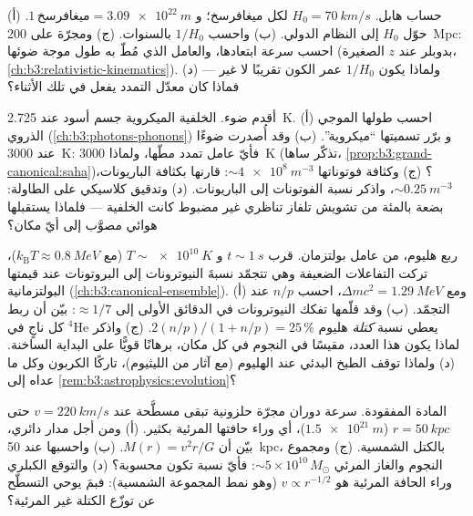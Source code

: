 \begin{exercise}[$\star\star\star$]\label{exo:b3:astrophysics:9}
حساب هابل. $H_0 = \qty{70}{km/s}$ لكل ميغافرسخ؛ و $1\,
\text{ميغافرسخ} = \qty{3.09e22}{m}$. (أ) حوّل $H_0$ إلى النظام الدولي. (ب)
واحسب $1/H_0$ بالسنوات. (ج) ومجرّة على \qty{200}{Mpc}: احسب
سرعة ابتعادها، والعامل الذي مُطّ به طول موجة ضوئها
(بدوبلر عند $z$ الصغيرة،
\cref{ch:b3:relativistic-kinematics}). (د) ولماذا يكون $1/H_0$
عمر الكون تقريبًا لا غير --- فماذا كان معدّل التمدد
يفعل في تلك الأثناء؟
\end{exercise}

\begin{exercise}[$\star\star\star$]\label{exo:b3:astrophysics:10}
أقدم ضوء. الخلفية الميكروية جسم أسود عند \qty{2.725}{K}. (أ)
احسب طولها الموجي الذروي (\cref{ch:b3:photons-phonons}) و
برّر تسميتها ``ميكروية''. (ب) وقد أُصدرت ضوءًا عند
\qty{3000}{K}: فأيّ عامل تمدد مطّها،
ولماذا \qty{3000}{K} (تذكّر ساها،
\cref{prop:b3:grand-canonical:saha})؟ (ج) وكثافة فوتوناتها
$\sim\qty{4e8}{m^{-3}}$: قارنها بكثافة الباريونات،
$\sim\qty{0.25}{m^{-3}}$، واذكر نسبة الفوتونات إلى الباريونات.
(د) وتدقيق كلاسيكي على الطاولة: بضعة بالمئة من تشويش تلفاز
تناظري غير مضبوط كانت الخلفية --- فلماذا يستقبلها هوائي
مصوَّب إلى أيّ مكان؟
\end{exercise}

\begin{exercise}[$\star\star\star$]\label{exo:b3:astrophysics:11}
ربع هليوم، من عامل بولتزمان. قرب $t \sim
\qty{1}{s}$ و $T \sim \qty{e10}{K}$ (مع $k_{\text{B}}T \approx
\qty{0.8}{MeV}$)، تركت التفاعلات الضعيفة وهي تتجمّد
نسبةَ النيوترونات إلى البروتونات عند قيمتها البولتزمانية
(\cref{ch:b3:canonical-ensemble}). (أ) ومع $\Delta mc^2 =
\qty{1.29}{MeV}$، احسب $n/p$ عند التجمّد. (ب) وقد قلّمها تفكك النيوترونات
في الدقائق الأولى إلى $\approx1/7$: بيّن أن ربط كل ناجٍ
في $^4$He يعطي نسبة \emph{كتلة} هليوم
$2(n/p)/(1 + n/p) = 25\,\%$. (ج) واذكر لماذا يكون هذا العدد،
مقيسًا في النجوم في كل مكان، برهانًا قويًّا على البداية
الساخنة. (د) ولماذا توقف الطبخ البدئي عند الهليوم
(مع آثار من الليثيوم)، تاركًا الكربون وكل ما عداه إلى
\cref{rem:b3:astrophysics:evolution}؟
\end{exercise}

\begin{exercise}[$\star\star\star$]\label{exo:b3:astrophysics:12}
المادة المفقودة. سرعة دوران مجرّة حلزونية تبقى مسطَّحة
عند $v = \qty{220}{km/s}$ حتى $r = \qty{50}{kpc}$
($\qty{1.5e21}{m}$)، أي وراء حافتها المرئية بكثير. (أ) ومن أجل
مدار دائري، بيّن أن $M(r) = v^2r/G$. (ب) واحسبها عند
\qty{50}{kpc}، بالكتل الشمسية. (ج) ومجموع النجوم والغاز المرئي
$\sim5\times10^{10}\,M_\odot$: فأيّ نسبة تكون
محسوبة؟ (د) والتوقع الكبلري وراء الحافة المرئية
هو $v \propto r^{-1/2}$ (وهو نمط المجموعة الشمسية): فبمَ يوحي
التسطّح عن توزّع الكتلة غير المرئية؟
\end{exercise}

